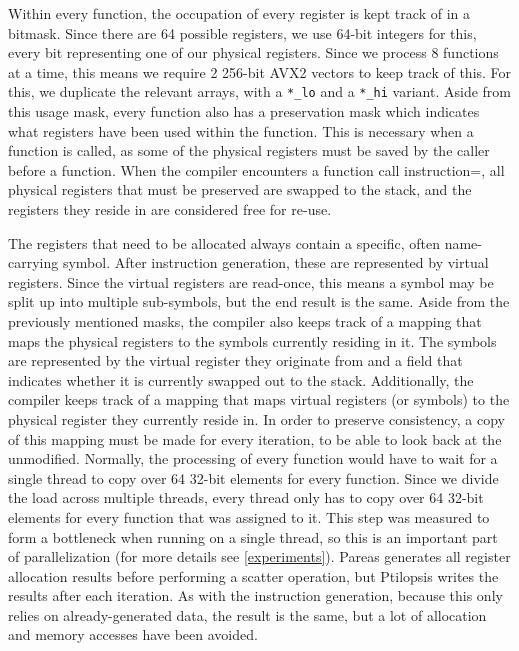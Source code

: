 \documentclass[12pt,dvipsnames]{article}
\newcommand{\mono}[1]{\texttt{#1}}
\begin{document}
Within every function, the occupation of every register is kept track of in a bitmask. Since there are 64 possible registers, we use 64-bit integers for this, every bit representing one of our physical registers. Since we process 8 functions at a time, this means we require 2 256-bit AVX2 vectors to keep track of this. For this, we duplicate the relevant arrays, with a \mono{*\_lo} and a \mono{*\_hi} variant. Aside from this usage mask, every function also has a preservation mask which indicates what registers have been used within the function. This is necessary when a function is called, as some of the physical registers must be saved by the caller before a function. When the compiler encounters a function call instruction=, all physical registers that must be preserved are swapped to the stack, and the registers they reside in are considered free for re-use.

The registers that need to be allocated always contain a specific, often name-carrying symbol. After instruction generation, these are represented by virtual registers. Since the virtual registers are read-once, this means a symbol may be split up into multiple sub-symbols, but the end result is the same. Aside from the previously mentioned masks, the compiler also keeps track of a mapping that maps the physical registers to the symbols currently residing in it. The symbols are represented by the virtual register they originate from and a field that indicates whether it is currently swapped out to the stack. Additionally, the compiler keeps track of a mapping that maps virtual registers (or symbols) to the physical register they currently reside in. In order to preserve consistency, a copy of this mapping must be made for every iteration, to be able to look back at the unmodified. Normally, the processing of every function would have to wait for a single thread to copy over 64 32-bit elements for every function. Since we divide the load across multiple threads, every thread only has to copy over 64 32-bit elements for every function that was assigned to it. This step was measured to form a bottleneck when running on a single thread, so this is an important part of parallelization (for more details see \autoref{experiments}). Pareas generates all register allocation results before performing a scatter operation, but Ptilopsis writes the results after each iteration. As with the instruction generation, because this only relies on already-generated data, the result is the same, but a lot of allocation and memory accesses have been avoided.
\end{document}
